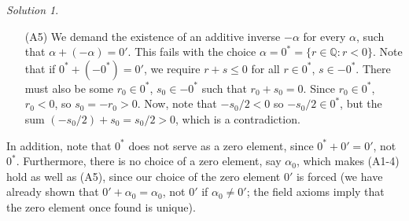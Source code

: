 \documentclass[11pt]{report}
\def\Q{\mathbb{Q}}
\theoremstyle{remark}
\newtheorem*{solution}{Solution}
\begin{document}
\begin{solution}
\begin{itemize}
            \item[(A5)] We demand the existence of an additive inverse $-\alpha$ for
            every $\alpha$, such that $\alpha + (-\alpha) = 0'$. This fails with the
            choice $\alpha = 0^* = \{r \in \Q: r < 0\}$. Note that if $0^* + (-0^*)
            = 0'$, we require $r + s \leq 0$ for all $r \in 0^*$, $s \in -0^*$.
            There must also be some $r_0 \in 0^*$, $s_0 \in -0^*$ such that $r_0 +
            s_0 = 0$. Since $r_0 \in 0^*$, $r_0 < 0$, so $s_0 = -r_0 > 0$.  Now,
            note that $-s_0 / 2 < 0$ so $-s_0 / 2 \in 0^*$, but the sum $(-s_0 / 2)
            + s_0 = s_0 / 2 > 0$, which is a contradiction.
        \end{itemize}

        In addition, note that $0^*$ does not serve as a zero element, since $0^* +
        0' = 0'$, not $0^*$. Furthermore, there is no choice of a zero element, say
        $\alpha_0$, which makes (A1-4) hold as well as (A5), since our choice of the
        zero element $0'$ is forced (we have already shown that $0' + \alpha_0 =
        \alpha_0$, not $0'$ if $\alpha_0 \neq 0'$; the field axioms imply that the
        zero element once found is unique).
    \end{solution}
    
    
    
\end{document}
